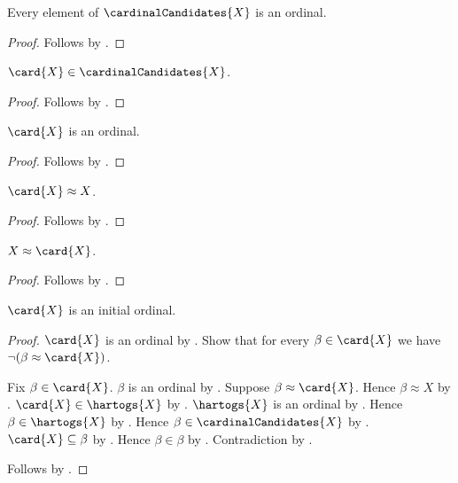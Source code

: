 \begin{proposition}\label{cardinal_candidates_are_ordinals}
    Every element of $\cardinalCandidates{X}$ is an ordinal.
\end{proposition}
\begin{proof}
    Follows by .
\end{proof}

\begin{proposition}\label{card_belongs_to_candidates}
    $\card{X}\in\cardinalCandidates{X}$.
\end{proposition}
\begin{proof}
    Follows by
        .
\end{proof}

\begin{proposition}\label{card_is_ordinal}
    $\card{X}$ is an ordinal.
\end{proposition}
\begin{proof}
    Follows by .
\end{proof}

\begin{proposition}\label{card_equinumerous}
    $\card{X}\approx X$.
\end{proposition}
\begin{proof}
    Follows by .
\end{proof}

\begin{corollary}\label{equinumerous_card}
    $X\approx\card{X}$.
\end{corollary}
\begin{proof}
    Follows by .
\end{proof}

\begin{theorem}\label{card_is_initial_ordinal}
    $\card{X}$ is an initial ordinal.
\end{theorem}
\begin{proof}
    $\card{X}$ is an ordinal by .
    Show that for every $\beta\in\card{X}$ we have
        $\lnot(\beta\approx\card{X})$.
    \begin{subproof}
        Fix $\beta\in\card{X}$.
        $\beta$ is an ordinal by .
        Suppose $\beta\approx\card{X}$.
        Hence $\beta\approx X$
            by .
        $\card{X}\in\hartogs{X}$
            by .
        $\hartogs{X}$ is an ordinal by .
        Hence $\beta\in\hartogs{X}$ by .
        Hence $\beta\in\cardinalCandidates{X}$
            by .
        $\card{X}\subseteq\beta$
            by
            .
        Hence $\beta\in\beta$ by .
        Contradiction by .
    \end{subproof}
    Follows by .
\end{proof}

